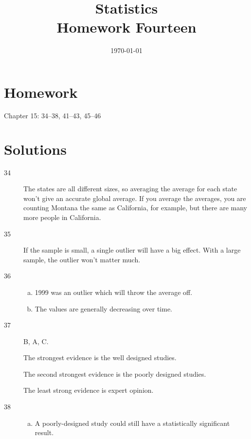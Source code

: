 \documentclass[letterpaper, landscape]{exam}
\title{Statistics \\ Homework Fourteen}
\date{\today}
\author{}
\begin{document}
  \maketitle

  \section{Homework}
  Chapter 15: 34--38, 41--43, 45--46

  \ifprintanswers{}
    \section{Solutions}
    \begin{description}

      \item[34] 
        The states are all different sizes, so averaging the average for each
        state won't give an accurate global average. If you average the
        averages, you are counting Montana the same as California, for example,
        but there are many more people in California.

      \item[35] If the sample is small, a single outlier will have a big effect.
        With a large sample, the outlier won't matter much. 

      \item[36] 
        
        \begin{enumerate}[(a)]
          \item 1999 was an outlier which will throw the average off.
          \item The values are generally decreasing over time.
        \end{enumerate}

      \item[37] B, A, C.

        The strongest evidence is the well designed studies.

        The second strongest evidence is the poorly designed studies.

        The least strong evidence is expert opinion.

      \item[38]
        \begin{enumerate}[(a)]
          \item A poorly-designed study could still have a statistically
            significant result.


\end{enumerate}
\end{description}
\end{document}
